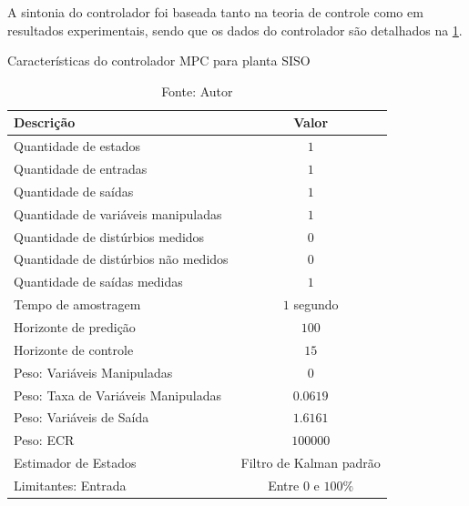 A sintonia do controlador foi baseada tanto na teoria de controle como em resultados experimentais,
sendo que os dados do controlador são detalhados na \cref{tab:mpc_siso_details}.

\begin{table}[h]
	\centering
	\caption{Características do controlador MPC para planta SISO}
	\label{tab:mpc_siso_details}
	\begin{tabular}{lc} \toprule
		{Descrição} 		                            & {Valor}    					\\ \midrule
		Quantidade de estados 		                    & $1$ 						    \\
		Quantidade de entradas 		                    & $1$ 						    \\
		Quantidade de saídas 		                    & $1$ 						    \\
		Quantidade de variáveis manipuladas 		    & $1$ 						    \\
		Quantidade de distúrbios medidos 		        & $0$ 						    \\
		Quantidade de distúrbios não medidos 		    & $0$ 						    \\
		Quantidade de saídas medidas 		            & $1$ 						    \\
		Tempo de amostragem 		                    & $1$ segundo 					\\
		Horizonte de predição 		                    & $100$  						\\
		Horizonte de controle 		                    & $15$  						\\
		Peso: Variáveis Manipuladas 		            & $0$  						    \\
		Peso: Taxa de Variáveis Manipuladas 		    & $0.0619$  				    \\
		Peso: Variáveis de Saída 		                & $1.6161$  					\\
		Peso: ECR 		                                & $100000$  					\\
		Estimador de Estados 		                    & Filtro de Kalman padrão  		\\
		Limitantes: Entrada 		                    & Entre $0$ e $100\%$  			\\ \bottomrule
	\end{tabular}
	\caption*{Fonte: Autor}
\end{table}

